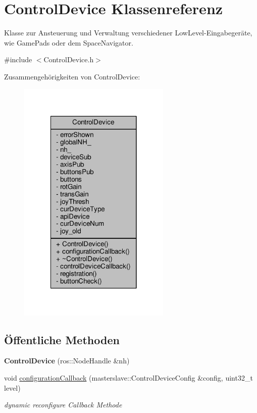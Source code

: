 \hypertarget{classControlDevice}{\section{Control\-Device Klassenreferenz}
\label{classControlDevice}
}


Klasse zur Ansteuerung und Verwaltung verschiedener Low\-Level-\/\-Eingabegeräte, wie Game\-Pads oder dem Space\-Navigator.  




{\ttfamily \#include $<$Control\-Device.\-h$>$}



Zusammengehörigkeiten von Control\-Device\-:
\nopagebreak
\begin{figure}[H]
\begin{center}
\leavevmode
\includegraphics[width=206pt]{classControlDevice__coll__graph}
\end{center}
\end{figure}
\subsection*{Öffentliche Methoden}
\begin{DoxyCompactItemize}
\item 
\hypertarget{classControlDevice_ae28b973d924a233a70275dedc640d430}{{\bfseries Control\-Device} (ros\-::\-Node\-Handle \&nh)}\label{classControlDevice_ae28b973d924a233a70275dedc640d430}

\item 
void \hyperlink{classControlDevice_afc4d912d844cd888f87414bca1b68aa6}{configuration\-Callback} (masterslave\-::\-Control\-Device\-Config \&config, uint32\-\_\-t level)
\begin{DoxyCompactList}\small\item\em dynamic reconfigure Callback Methode \end{DoxyCompactList}\end{DoxyCompactItemize}
